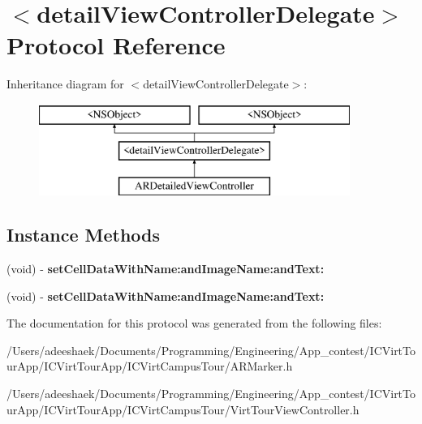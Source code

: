 \hypertarget{protocoldetail_view_controller_delegate-p}{\section{$<$detail\-View\-Controller\-Delegate$>$ Protocol Reference}
\label{protocoldetail_view_controller_delegate-p}
}
Inheritance diagram for $<$detail\-View\-Controller\-Delegate$>$\-:\begin{figure}[H]
\begin{center}
\leavevmode
\includegraphics[height=3.000000cm]{protocoldetail_view_controller_delegate-p}
\end{center}
\end{figure}
\subsection*{Instance Methods}
\begin{DoxyCompactItemize}
\item 
\hypertarget{protocoldetail_view_controller_delegate-p_a7db6bd35718ac78cf9d0ace37a65ff05}{(void) -\/ {\bfseries set\-Cell\-Data\-With\-Name\-:and\-Image\-Name\-:and\-Text\-:}}\label{protocoldetail_view_controller_delegate-p_a7db6bd35718ac78cf9d0ace37a65ff05}

\item 
\hypertarget{protocoldetail_view_controller_delegate-p_a7db6bd35718ac78cf9d0ace37a65ff05}{(void) -\/ {\bfseries set\-Cell\-Data\-With\-Name\-:and\-Image\-Name\-:and\-Text\-:}}\label{protocoldetail_view_controller_delegate-p_a7db6bd35718ac78cf9d0ace37a65ff05}

\end{DoxyCompactItemize}


The documentation for this protocol was generated from the following files\-:\begin{DoxyCompactItemize}
\item 
/\-Users/adeeshaek/\-Documents/\-Programming/\-Engineering/\-App\-\_\-contest/\-I\-C\-Virt\-Tour\-App/\-I\-C\-Virt\-Tour\-App/\-I\-C\-Virt\-Campus\-Tour/A\-R\-Marker.\-h\item 
/\-Users/adeeshaek/\-Documents/\-Programming/\-Engineering/\-App\-\_\-contest/\-I\-C\-Virt\-Tour\-App/\-I\-C\-Virt\-Tour\-App/\-I\-C\-Virt\-Campus\-Tour/Virt\-Tour\-View\-Controller.\-h\end{DoxyCompactItemize}
